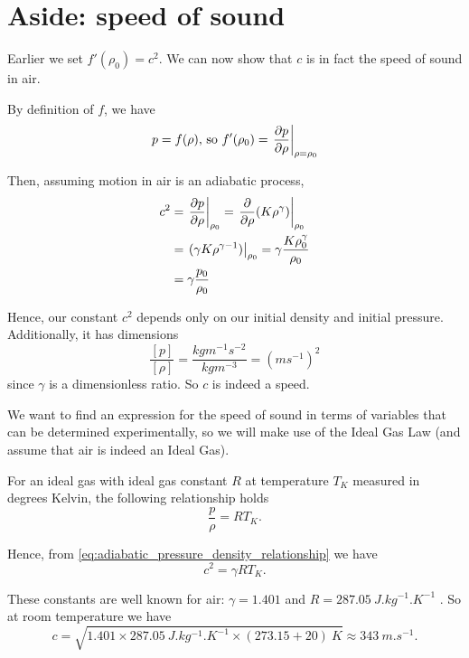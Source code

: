 \section{Aside: speed of sound}\label{ss:speed_of_sound}
Earlier we set $f'(\rho_0)=c^2$. We can now show that $c$ is in fact the speed of sound in air. \par
%
By definition of $f$, we have
    \begin{equation}
         p = f(\rho) \text{, so } f'(\rho_0) = \left.\frac{\partial p}{\partial \rho} \right|_{\rho=\rho_0}
    \end{equation} \par
%
Then, assuming motion in air is an adiabatic process,
    \begin{align*}
        c^2 &= \left. \frac{\partial p}{\partial \rho} \right|_{\rho_0}
        = \left. \frac{\partial }{\partial \rho} (K \rho^\gamma) \right|_{\rho_0} \\
        &= \left. (\gamma K \rho^{\gamma-1}) \right|_{\rho_0}
        = \gamma \frac{K \rho_0 ^\gamma}{\rho_0} \\
        &= \gamma \frac{p_0}{\rho_0}
    \end{align*} \par
Hence, our constant $c^2$ depends only on our initial density and initial pressure. Additionally, it has dimensions
    \begin{equation}\label{eq:adiabatic_pressure_density_relationship}
        \frac{[p]}{[\rho]} = \frac{kgm^{-1}s^{-2}}{kgm^{-3}} = (ms^{-1})^2
    \end{equation}
since $\gamma$ is a dimensionless ratio. So $c$ is indeed a speed. \par
We want to find an expression for the speed of sound in terms of variables that can be determined experimentally, so we will make use of the Ideal Gas Law (and assume that air is indeed an Ideal Gas).
\begin{law}
    For an ideal gas with ideal gas constant $R$ at temperature $T_K$ measured in degrees Kelvin, the following relationship holds
        \begin{equation*}
            \frac{p}{\rho} = R T_K.
        \end{equation*}
    \end{law} \par
%
Hence, from \eqref{eq:adiabatic_pressure_density_relationship} we have
    \begin{equation}
        c^2 = \gamma R T_K.
    \end{equation}\par
These constants are well known for air: $\gamma = 1.401$ \parencite{engineering03heatratio} and $R = 287.05 ~\si{J.kg^{-1}.K^{-1}}$ \parencite{engineering03gasconstants}. So at room temperature we have
  \begin{equation*}
    c = \sqrt{1.401 \times 287.05 ~\si{J.kg^{-1}.K^{-1}} \times (273.15+20) ~\si{K}} \approx 343 ~\si{m.s^{-1}}.
  \end{equation*}
